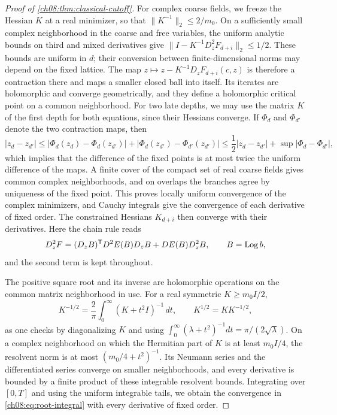 \begin{proof}[Proof of \cref{ch08:thm:classical-cutoff}]
For complex coarse fields, we freeze the Hessian $K$ at a real minimizer, so that $\|K^{-1}\|_2\le2/m_0$. On a sufficiently small complex neighborhood in the coarse and free variables, the uniform analytic bounds on third and mixed derivatives give $\|I-K^{-1}D_z^2F_{d+i}\|_2\le1/2$. These bounds are uniform in $d$; their conversion between finite-dimensional norms may depend on the fixed lattice. The map $z\mapsto z-K^{-1}D_zF_{d+i}(c,z)$ is therefore a contraction there and maps a smaller closed ball into itself. Its iterates are holomorphic and converge geometrically, and they define a holomorphic critical point on a common neighborhood. For two late depths, we may use the matrix $K$ of the first depth for both equations, since their Hessians converge. If $\Phi_d$ and $\Phi_{d'}$ denote the two contraction maps, then
\[
 |z_d-z_{d'}|\le|\Phi_d(z_d)-\Phi_d(z_{d'})|+|\Phi_d(z_{d'})-\Phi_{d'}(z_{d'})|
 \le\frac12|z_d-z_{d'}|+\sup|\Phi_d-\Phi_{d'}|,
\]
which implies that the difference of the fixed points is at most twice the uniform difference of the maps. A finite cover of the compact set of real coarse fields gives common complex neighborhoods, and on overlaps the branches agree by uniqueness of the fixed point. This proves locally uniform convergence of the complex minimizers, and Cauchy integrals give the convergence of each derivative of fixed order. The constrained Hessians $K_{d+i}$ then converge with their derivatives. Here the chain rule reads
\[
 D_z^2F=(D_zB)^{\mathsf T}D^2E(B)D_zB+DE(B)D_z^2B,
 \qquad B=\operatorname{Log} b,
\]
and the second term is kept throughout.

The positive square root and its inverse are holomorphic operations on the common matrix neighborhood in use. For a real symmetric $K\ge m_0I/2$,
\begin{equation}\label{ch08:eq:root-integral}
 K^{-1/2}=\frac2\pi\int_0^\infty(K+t^2I)^{-1}\,dt,
 \qquad K^{1/2}=KK^{-1/2},
\end{equation}
as one checks by diagonalizing $K$ and using $\int_0^\infty(\lambda+t^2)^{-1}dt=\pi/(2\sqrt\lambda)$. On a complex neighborhood on which the Hermitian part of $K$ is at least $m_0I/4$, the resolvent norm is at most $(m_0/4+t^2)^{-1}$. Its Neumann series and the differentiated series converge on smaller neighborhoods, and every derivative is bounded by a finite product of these integrable resolvent bounds. Integrating over $[0,T]$ and using the uniform integrable tails, we obtain the convergence in \eqref{ch08:eq:root-integral} with every derivative of fixed order.


\end{proof}
